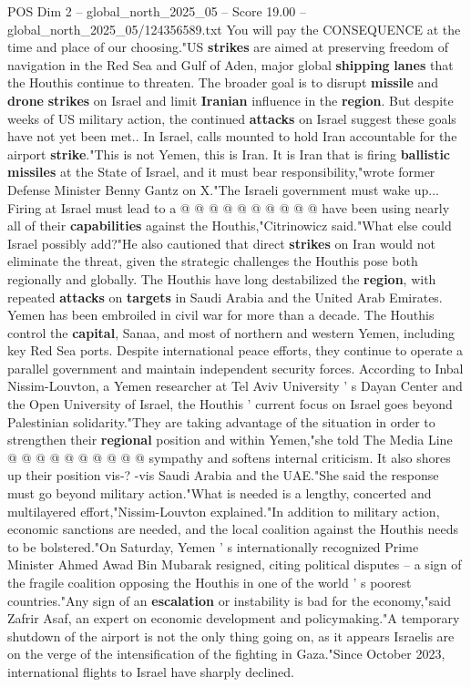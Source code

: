 \begin{textsample}{POS Dim 2 – global\_north\_2025\_05 – Score 19.00 – global\_north\_2025\_05/124356589.txt}
You will pay the CONSEQUENCE at the time and place of our choosing."US \textbf{strikes} are aimed at preserving freedom of navigation in the Red Sea and Gulf of Aden, major global \textbf{shipping} \textbf{lanes} that the Houthis continue to threaten.
The broader goal is to disrupt \textbf{missile} and \textbf{drone} \textbf{strikes} on Israel and limit \textbf{Iranian} influence in the \textbf{region}.
But despite weeks of US military action, the continued \textbf{attacks} on Israel suggest these goals have not yet been met..
In Israel, calls mounted to hold Iran accountable for the airport \textbf{strike}."This is not Yemen, this is Iran.
It is Iran that is firing \textbf{ballistic} \textbf{missiles} at the State of Israel, and it must bear responsibility,"wrote former Defense Minister Benny Gantz on X."The Israeli government must wake up...
Firing at Israel must lead to a @ @ @ @ @ @ @ @ @ @ have been using nearly all of their \textbf{capabilities} against the Houthis,"Citrinowicz said."What else could Israel possibly add?"He also cautioned that direct \textbf{strikes} on Iran would not eliminate the threat, given the strategic challenges the Houthis pose both regionally and globally.
The Houthis have long destabilized the \textbf{region}, with repeated \textbf{attacks} on \textbf{targets} in Saudi Arabia and the United Arab Emirates.
Yemen has been embroiled in civil war for more than a decade.
The Houthis control the \textbf{capital}, Sanaa, and most of northern and western Yemen, including key Red Sea ports.
Despite international peace efforts, they continue to operate a parallel government and maintain independent security forces.
According to Inbal Nissim-Louvton, a Yemen researcher at Tel Aviv University ' s Dayan Center and the Open University of Israel, the Houthis ' current focus on Israel goes beyond Palestinian solidarity."They are taking advantage of the situation in order to strengthen their \textbf{regional} position and within Yemen,"she told The Media Line @ @ @ @ @ @ @ @ @ @ sympathy and softens internal criticism.
It also shores up their position vis-? -vis Saudi Arabia and the UAE."She said the response must go beyond military action."What is needed is a lengthy, concerted and multilayered effort,"Nissim-Louvton explained."In addition to military action, economic sanctions are needed, and the local coalition against the Houthis needs to be bolstered."On Saturday, Yemen ' s internationally recognized Prime Minister Ahmed Awad Bin Mubarak resigned, citing political disputes -- a sign of the fragile coalition opposing the Houthis in one of the world ' s poorest countries."Any sign of an \textbf{escalation} or instability is bad for the economy,"said Zafrir Asaf, an expert on economic development and policymaking."A temporary shutdown of the airport is not the only thing going on, as it appears Israelis are on the verge of the intensification of the fighting in Gaza."Since October 2023, international flights to Israel have sharply declined.

\end{textsample}
